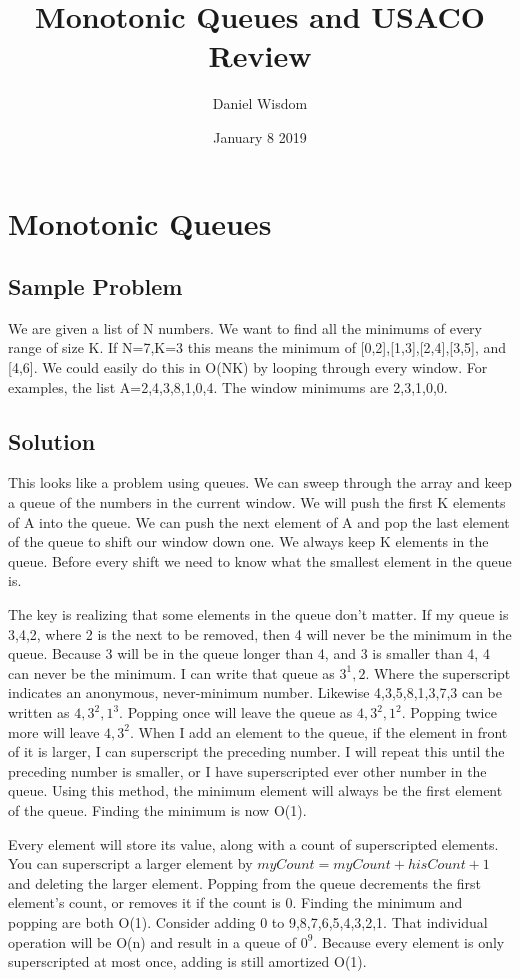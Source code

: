 \documentclass{article}
\title{Monotonic Queues and USACO Review}
\author{Daniel Wisdom}
\date{January 8 2019}
\begin{document}
\maketitle


\section{Monotonic Queues}
\subsection{Sample Problem}
    We are given a list of N numbers. We want to find all the minimums of every range of size K. If N=7,K=3 this means the minimum of [0,2],[1,3],[2,4],[3,5], and [4,6]. We could easily do this in O(NK) by looping through every window. For examples, the list A=2,4,3,8,1,0,4. The window minimums are 2,3,1,0,0.
    
\subsection{Solution}
    This looks like a problem using queues. We can sweep through the array and keep a queue of the numbers in the current window. We will push the first K elements of A into the queue. We can push the next element of A and pop the last element of the queue to shift our window down one. We always keep K elements in the queue. Before every shift we need to know what the smallest element in the queue is.
    
    The key is realizing that some elements in the queue don't matter. If my queue is 3,4,2, where 2 is the next to be removed, then 4 will never be the minimum in the queue. Because 3 will be in the queue longer than 4, and 3 is smaller than 4, 4 can never be the minimum. I can write that queue as $3^1, 2$. Where the superscript indicates an anonymous, never-minimum number. Likewise 4,3,5,8,1,3,7,3 can be written as $4, 3^2, 1^3$. Popping once will leave the queue as $4, 3^2, 1^2$. Popping twice more will leave $4, 3^2$. When I add an element to the queue, if the element in front of it is larger, I can superscript the preceding number. I will repeat this until the preceding number is smaller, or I have superscripted ever other number in the queue. Using this method, the minimum element will always be the first element of the queue. Finding the minimum is now O(1). 
    
    Every element will store its value, along with a count of superscripted elements. You can superscript a larger element by $myCount=myCount+hisCount+1$ and deleting the larger element. Popping from the queue decrements the first element's count, or removes it if the count is 0. Finding the minimum and popping are both O(1). Consider adding 0 to 9,8,7,6,5,4,3,2,1. That individual operation will be O(n) and result in a queue of $0^9$. Because every element is only superscripted at most once, adding is still amortized O(1).
    
\end{document}
